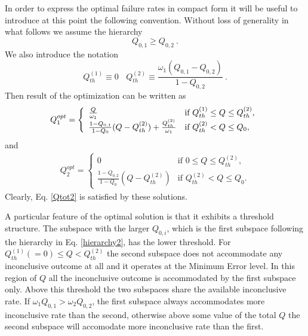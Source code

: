 \documentclass[aps,pra,twocolumn,eqsecnum,showpacs]{revtex4}
\begin{document}
In order to express the optimal failure rates in compact form it will be useful to introduce at this point the following convention. Without loss of generality in what follows we assume the hierarchy
\begin{equation}
Q_{0,1} \geq Q_{0,2} \ .
\label{hierarchy2}
\end{equation}
We also introduce the notation
\begin{equation}
Q_{th}^{(1)} \equiv 0 \ \ \ \ Q_{th}^{(2)} \equiv \frac{\omega_{1}(Q_{0,1} - Q_{0,2})}{1-Q_{0,2}} \ .
\label{Qth12}
\end{equation}
Then result of the optimization can be written as
\begin{eqnarray}
    \label{Q1opt}
    Q_{1}^{opt} = \left\{\begin{array}{ll}
    \frac{Q}{ \omega_{1} } & \mbox{if $Q_{th}^{(1)} \leq Q \leq   Q_{th}^{(2)}$}, \\
    \frac{1-Q_{0,1}}{1-Q_{0}}(Q - Q_{th}^{(2)}) + \frac{Q_{th}^{(2)}}{ \omega_{1} } & \mbox{if $ Q_{th}^{(2)} < Q \leq Q_{0}$},
    \end{array}
    \right. \nonumber \\
\end{eqnarray}
and
\begin{eqnarray}
    \label{Q2opt}
    Q_{2}^{opt} = \left\{\begin{array}{ll}
    0 & \mbox{if $0 \leq Q \leq  Q_{th}^{(2)} $}, \\
    \frac{1-Q_{0,2}}{1-Q_{0}} (Q-Q_{th}^{(2)})& \mbox{if $Q_{th}^{(2)} < Q \leq
    Q_{0} $} .
    \end{array}
    \right.
\end{eqnarray}
Clearly, Eq. \eqref{Qtot2} is satisfied by these solutions. 

A particular feature of the optimal solution is that it exhibits a threshold structure. The subspace with the larger $Q_{0,i}$, which is the first subspace following the hierarchy in Eq. \eqref{hierarchy2}, has the lower threshold. For $Q_{th}^{(1)}(=0) \leq Q < Q_{th}^{(2)}$ the second subspace does not accommodate any inconclusive outcome at all and it operates at the Minimum Error level. In this region of $Q$ all the inconclusive outcome is accommodated by the first subspace only. Above this threshold the two subspaces share the available inconclusive rate. If $\omega_{1}Q_{0,1} > \omega_{2}Q_{0,2}$, the first subspace always accommodates more inconclusive rate than the second, otherwise above some value of the total $Q$ the second subspace will accomodate more inconclusive rate than the first.  
\end{document}
